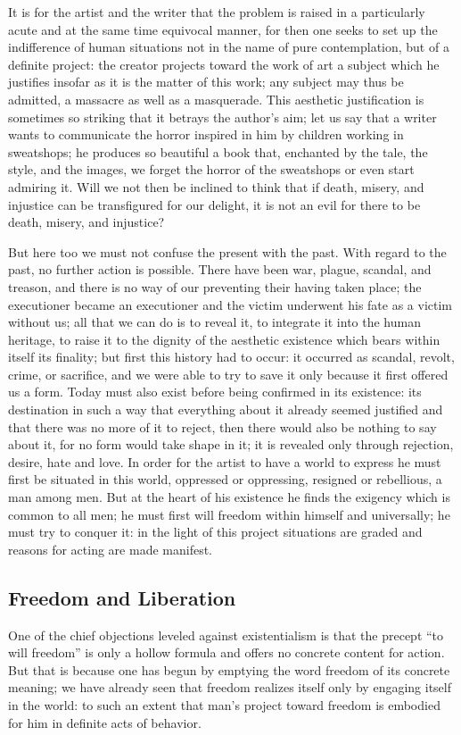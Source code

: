 \documentclass[11pt]{article}
\begin{document}
{{It is for the artist and the writer that the problem is raised in a particularly acute and at the same time equivocal manner, for then one seeks to set up the indifference of human situations not in the name of pure contemplation, but of a definite project: the creator projects toward the work of art a subject which he justifies insofar as it is the matter of this work; any subject may thus be admitted, a massacre as well as a masquerade. This aesthetic justification is sometimes so striking that it betrays the author’s aim; let us say that a writer wants to communicate the horror inspired in him by children working in sweatshops; he produces so beautiful a book that, enchanted by the tale, the style, and the images, we forget the horror of the sweatshops or even start admiring it. Will we not then be inclined to think that if death, misery, and injustice can be transfigured for our delight, it is not an evil for there to be death, misery, and injustice?

But here too we must not confuse the present with the past. With regard to the past, no further action is possible. There have been war, plague, scandal, and treason, and there is no way of our preventing their having taken place; the executioner became an executioner and the victim underwent his fate as a victim without us; all that we can do is to reveal it, to integrate it into the human heritage, to raise it to the dignity of the aesthetic existence which bears within itself its finality; but first this history had to occur: it occurred as scandal, revolt, crime, or sacrifice, and we were able to try to save it only because it first offered us a form. Today must also exist before being confirmed in its existence: its destination in such a way that everything about it already seemed justified and that there was no more of it to reject, then there would also be nothing to say about it, for no form would take shape in it; it is revealed only through rejection, desire, hate and love. In order for the artist to have a world to express he must first be situated in this world, oppressed or oppressing, resigned or rebellious, a man among men. But at the heart of his existence he finds the exigency which is common to all men; he must first will freedom within himself and universally; he must try to conquer it: in the light of this project situations are graded and reasons for acting are made manifest.
\subsection{Freedom and Liberation}
One of the chief objections leveled against existentialism is that the precept “to will freedom” is only a hollow formula and offers no concrete content for action. But that is because one has begun by emptying the word freedom of its concrete meaning; we have already seen that freedom realizes itself only by engaging itself in the world: to such an extent that man’s project toward freedom is embodied for him in definite acts of behavior.

}}
\end{document}
